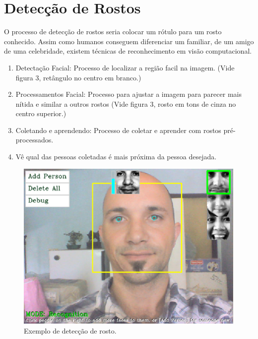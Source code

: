 \documentclass[12pt]{article}
\begin{document}
	\section{Detecção de Rostos}
	
	O processo de detecção de rostos seria colocar um rótulo para um rosto conhecido. Assim como humanos conseguem diferenciar um familiar, de um amigo de uma celebridade, existem técnicas de reconhecimento em visão computacional.
	
	\begin{enumerate}
		\item Detectação Facial: Processo de localizar a região facil na imagem. (Vide figura 3, retângulo no centro em branco.)
		\item Processamentos Facial: Processo para ajustar a imagem para parecer mais nítida e similar a outros rostos (Vide figura 3, rosto em tons de cinza no centro superior.)
		\item Coletando e aprendendo: Processo de coletar e aprender com rostos pré-processados.
		\item Vê qual das pessoas coletadas é mais próxima da pessoa desejada.
	\end{enumerate}
	
	\begin{figure}[ht!]
		\centering
		\includegraphics[width=\textwidth]{webcam}
		\caption{Exemplo de detecção de rosto.}
	\end{figure}
\end{document}
